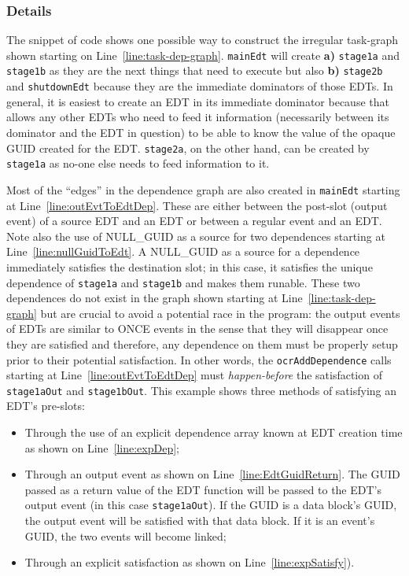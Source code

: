\subsubsection{Details}
The snippet of code shows one possible way to construct the irregular
task-graph shown starting on
Line~\ref{line:task-dep-graph}. \texttt{mainEdt} will create {\bf a)}
\texttt{stage1a} and \texttt{stage1b} as they are the next things that
need to execute but also {\bf b)} \texttt{stage2b} and
\texttt{shutdownEdt} because they are the immediate dominators of those
EDTs. In general, it is easiest to create an EDT in its immediate
dominator because that allows any other EDTs who need to feed it
information (necessarily between its dominator and the EDT in
question) to be able to know the value of the opaque GUID created for
the EDT. \texttt{stage2a}, on the other hand, can be created by
\texttt{stage1a} as no-one else needs to feed information to it.

Most of the ``edges'' in the dependence graph are also created in
\texttt{mainEdt} starting at Line~\ref{line:outEvtToEdtDep}. These
are either between the post-slot (output event) of a source EDT and
an EDT or between a regular event and an EDT. Note also the use of
NULL\_GUID as a source for two dependences starting at
Line~\ref{line:nullGuidToEdt}. A NULL\_GUID as a source for a
dependence immediately satisfies the destination slot; in this case,
it satisfies the unique dependence of \texttt{stage1a} and
\texttt{stage1b} and makes them runable. These two dependences do not
exist in the graph shown starting at Line~\ref{line:task-dep-graph}
but are crucial to avoid a potential race in the program: the output
events of EDTs are similar to ONCE events in the sense that they will
disappear once they are satisfied and therefore, any dependence on
them must be properly setup prior to their potential satisfaction. In
other words, the \texttt{ocrAddDependence} calls starting at
Line~\ref{line:outEvtToEdtDep} must \emph{happen-before} the
satisfaction of \texttt{stage1aOut} and \texttt{stage1bOut}.
This example shows three methods of satisfying an EDT's pre-slots:
\begin{itemize}
\item{Through the use of an explicit dependence array known at EDT
    creation time as shown on Line~\ref{line:expDep};}
\item{Through an output event as shown on
    Line~\ref{line:EdtGuidReturn}. The GUID passed as a return value
    of the EDT function will be passed to the EDT's output event (in
    this case \texttt{stage1aOut}). If the GUID is a data block's
    GUID, the output event will be satisfied with that data block. If
    it is an event's GUID, the two events will become linked;}
\item{Through an explicit satisfaction as shown on
    Line~\ref{line:expSatisfy}).}
\end{itemize}
